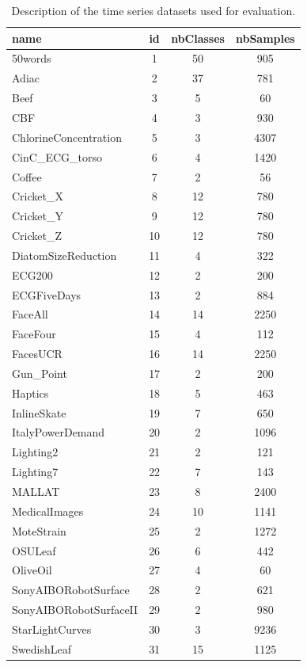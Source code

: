 \documentclass[10pt,journal,compsoc]{IEEEtran}
\begin{document}
\begin{table} [h!]
\begin{center}
\caption{Description of the time series datasets used for evaluation.} 
\label{didtNoda1}  
\small 
 \setlength{\tabcolsep}{.16667em} 
\begin{tabular}{lccc} 
name & id & nbClasses & nbSamples \\ 
\hline 
50words &  1 & 50 &  905 \\ 
Adiac &  2 & 37 &  781 \\ 
Beef &  3 &  5 &   60 \\ 
CBF &  4 &  3 &  930 \\ 
ChlorineConcentration &  5 &  3 & 4307 \\ 
CinC\_ECG\_torso &  6 &  4 & 1420 \\ 
Coffee &  7 &  2 &   56 \\ 
Cricket\_X &  8 & 12 &  780 \\ 
Cricket\_Y &  9 & 12 &  780 \\ 
Cricket\_Z & 10 & 12 &  780 \\ 
DiatomSizeReduction & 11 &  4 &  322 \\ 
ECG200 & 12 &  2 &  200 \\ 
ECGFiveDays & 13 &  2 &  884 \\ 
FaceAll & 14 & 14 & 2250 \\ 
FaceFour & 15 &  4 &  112 \\ 
FacesUCR & 16 & 14 & 2250 \\ 
Gun\_Point & 17 &  2 &  200 \\ 
Haptics & 18 &  5 &  463 \\ 
InlineSkate & 19 &  7 &  650 \\ 
ItalyPowerDemand & 20 &  2 & 1096 \\ 
Lighting2 & 21 &  2 &  121 \\ 
Lighting7 & 22 &  7 &  143 \\ 
MALLAT & 23 &  8 & 2400 \\ 
MedicalImages & 24 & 10 & 1141 \\ 
MoteStrain & 25 &  2 & 1272 \\ 
OSULeaf & 26 &  6 &  442 \\ 
OliveOil & 27 &  4 &   60 \\ 
SonyAIBORobotSurface & 28 &  2 &  621 \\ 
SonyAIBORobotSurfaceII & 29 &  2 &  980 \\ 
StarLightCurves & 30 &  3 & 9236 \\ 
SwedishLeaf & 31 & 15 & 1125 \\ 

\end{tabular}
\end{center}
\end{table}
\end{document}
